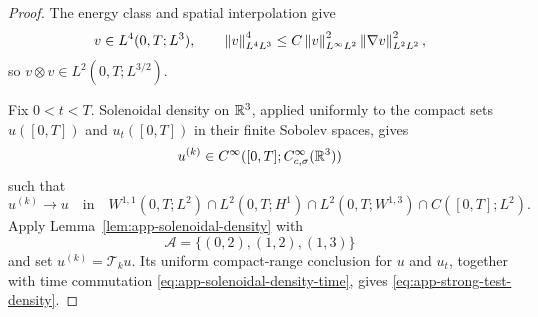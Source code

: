 \begin{proof}
The energy class and spatial interpolation give
\[
 v\in L^4(0,T;L^3),
 \qquad
 \left\lVert v\right\rVert_{L^4L^3}^4
 \le C\left\lVert v\right\rVert_{L^\infty L^2}^2
       \left\lVert \nabla v\right\rVert_{L^2L^2}^2,
\]
so \(v\otimes v\in L^2(0,T;L^{3/2})\).

Fix \(0<t<T\).  Solenoidal density on \(\mathbb R^3\), applied uniformly to the
compact sets \(u([0,T])\) and \(u_t([0,T])\) in their finite Sobolev spaces,
gives
\[
 u^{(k)}\in C^\infty([0,T];C_{c,\sigma}^\infty(\mathbb R^3))
\]
such that
\begin{equation}
 u^{(k)}\longrightarrow u
 \quad\text{in}\quad
 W^{1,1}(0,T;L^2)
 \cap L^2(0,T;H^1)
 \cap L^2(0,T;W^{1,3})
 \cap C([0,T];L^2).
 \label{eq:app-strong-test-density}
\end{equation}
Apply Lemma~\ref{lem:app-solenoidal-density} with
\[
 \mathscr A=\{(0,2),(1,2),(1,3)\}
\]
and set \(u^{(k)}=\mathcal T_ku\).  Its uniform compact-range conclusion
for \(u\) and \(u_t\), together with time commutation
\eqref{eq:app-solenoidal-density-time}, gives
\eqref{eq:app-strong-test-density}.


\end{proof}
